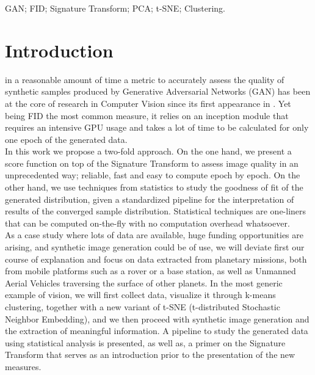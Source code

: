\documentclass[lettersize,journal]{IEEEtran}
\begin{document}
\begin{IEEEkeywords}
GAN; FID; Signature Transform; PCA; t-SNE; Clustering. 
\end{IEEEkeywords}

\section{Introduction}
 in a reasonable amount of time a metric to accurately assess the quality of synthetic samples produced by Generative Adversarial Networks (GAN) has been at the core of research in Computer Vision since its first appearance in \cite{Goodfellow14}. Yet being FID \cite{Heusel17} the most common measure, it relies on an inception module that requires an intensive GPU usage and takes a lot of time to be calculated for only one epoch of the generated data.
\\

In this work we propose a two-fold approach. On the one hand, we present a score function on top of the Signature Transform \cite{Lyons2014} to assess image quality in an unprecedented way; reliable, fast and easy to compute epoch by epoch. On the other hand, we use techniques from statistics to study the goodness of fit of the generated distribution, given a standardized pipeline for the interpretation of results of the converged sample distribution. Statistical techniques are one-liners that can be computed on-the-fly with no computation overhead whatsoever.
\\

As a case study where lots of data are available, huge funding opportunities are arising, and synthetic image generation could be of use, we will deviate first our course of explanation and focus on data extracted from planetary missions, both from mobile platforms such as a rover or a base station, as well as Unmanned Aerial Vehicles traversing the surface of other planets. In the most generic example of vision, we will first collect data, visualize it through k-means clustering, together with a new variant of t-SNE (t-distributed Stochastic Neighbor Embedding), and we then proceed with synthetic image generation and the extraction of meaningful information. A pipeline to study the generated data using statistical analysis is presented, as well as, a primer on the Signature Transform that serves as an introduction prior to the presentation of the new measures.
\\
\end{document}
